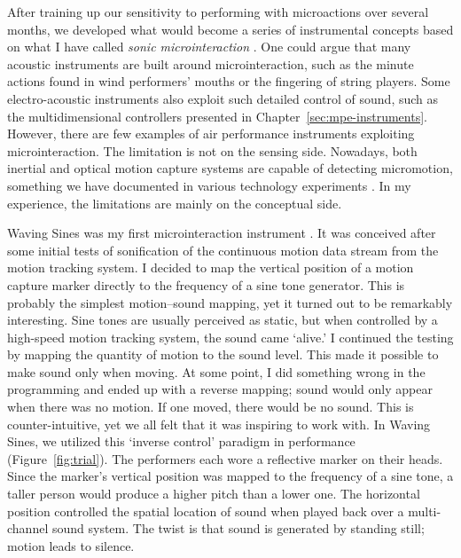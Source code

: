 After training up our sensitivity to performing with microactions over several months, we developed what would become a series of instrumental concepts based on what I have called \emph{sonic microinteraction} \citep{lesaffre_sonic_2017}. One could argue that many acoustic instruments are built around microinteraction, such as the minute actions found in wind performers' mouths or the fingering of string players. Some electro-acoustic instruments also exploit such detailed control of sound, such as the multidimensional controllers presented in Chapter~\ref{sec:mpe-instruments}. However, there are few examples of air performance instruments exploiting microinteraction. The limitation is not on the sensing side. Nowadays, both inertial and optical motion capture systems are capable of detecting micromotion, something we have documented in various technology experiments  \citep{skogstad_comparing_2011,jensenius_study_2012,nymoen_comparing_2012,bishop_reliability_2020}. In my experience, the limitations are mainly on the conceptual side.

Waving Sines was my first microinteraction instrument \citep{lesaffre_sonic_2017}. It was conceived after some initial tests of sonification of the continuous motion data stream from the motion tracking system. I decided to map the vertical position of a motion capture marker directly to the frequency of a sine tone generator. This is probably the simplest motion--sound mapping, yet it turned out to be remarkably interesting. Sine tones are usually perceived as static, but when controlled by a high-speed motion tracking system, the sound came `alive.' I continued the testing by mapping the quantity of motion to the sound level. This made it possible to make sound only when moving. At some point, I did something wrong in the programming and ended up with a reverse mapping; sound would only appear when there was no motion. If one moved, there would be no sound. This is counter-intuitive, yet we all felt that it was inspiring to work with. In Waving Sines, we utilized this `inverse control' paradigm in performance (Figure~\ref{fig:trial}). The performers each wore a reflective marker on their heads. Since the marker's vertical position was mapped to the frequency of a sine tone, a taller person would produce a higher pitch than a lower one. The horizontal position controlled the spatial location of sound when played back over a multi-channel sound system. The twist is that sound is generated by standing still; motion leads to silence.

